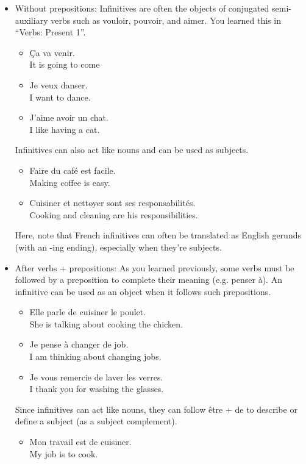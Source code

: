 \begin{itemize}
  \item  Without prepositions:  Infinitives are often the objects of conjugated semi-auxiliary verbs such as vouloir, pouvoir, and aimer. You learned this in ``Verbs: Present 1''.
    \begin{itemize}
       \item  {\c C}a va venir. \\ It is going to come
       \item  Je veux danser. \\ I want to dance.
       \item  J'aime avoir un chat. \\ I like having a cat.
    \end{itemize}
    Infinitives can also act like nouns and can be used as subjects.
    \begin{itemize}
       \item  Faire du caf{\'e} est facile. \\ Making coffee is easy.
       \item  Cuisiner et nettoyer sont ses responsabilit{\'e}s. \\ Cooking and cleaning are his responsibilities.
    \end{itemize}
    Here, note that French infinitives can often be translated as English gerunds (with an -ing ending), especially when they're subjects.
  \item  After verbs + prepositions:  As you learned previously, some verbs must be followed by a preposition to complete their meaning (e.g. penser {\`a}). An infinitive can be used as an object when it follows such prepositions.
    \begin{itemize}
       \item  Elle parle de cuisiner le poulet. \\ She is talking about cooking the chicken.
       \item  Je pense {\`a} changer de job. \\ I am thinking about changing jobs.
       \item  Je vous remercie de laver les verres. \\ I thank you for washing the glasses.
    \end{itemize}
    Since infinitives can act like nouns, they can follow {\^e}tre + de to describe or define a subject (as a subject complement).
    \begin{itemize}
       \item  Mon travail est de cuisiner. \\ My job is to cook.

\end{itemize}
\end{itemize}
